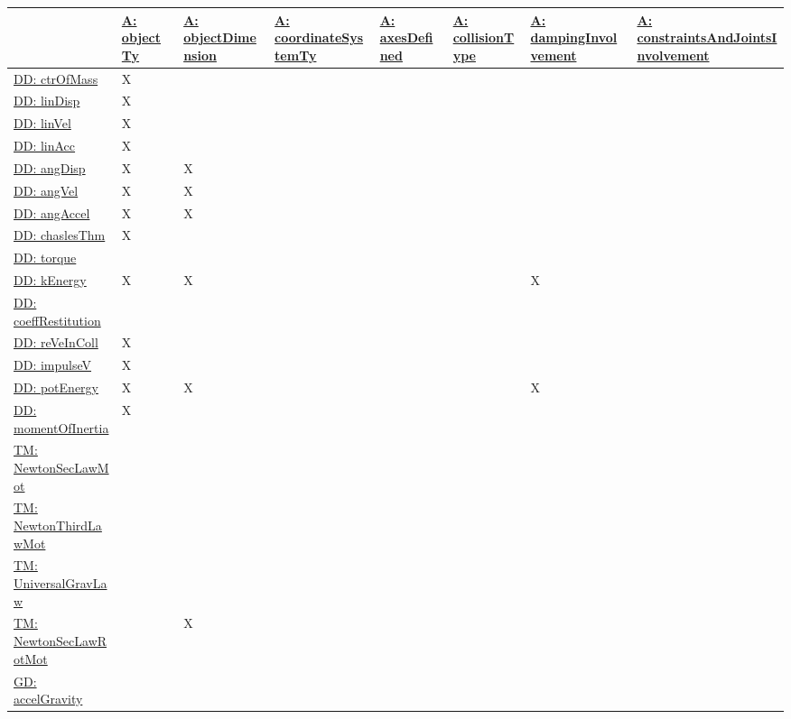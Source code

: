 \documentclass[12pt]{article}
\begin{document}
\begin{longtable}{l l l l l l l l}
\toprule
\textbf{} & \textbf{\hyperref[assumpOT]{A: objectTy}} & \textbf{\hyperref[assumpOD]{A: objectDimension}} & \textbf{\hyperref[assumpCST]{A: coordinateSystemTy}} & \textbf{\hyperref[assumpAD]{A: axesDefined}} & \textbf{\hyperref[assumpCT]{A: collisionType}} & \textbf{\hyperref[assumpDI]{A: dampingInvolvement}} & \textbf{\hyperref[assumpCAJI]{A: constraintsAndJointsInvolvement}}
\\
\midrule
\endhead
\hyperref[DD:ctrOfMass]{DD: ctrOfMass} & X &  &  &  &  &  & 
\\
\hyperref[DD:linDisp]{DD: linDisp} & X &  &  &  &  &  & 
\\
\hyperref[DD:linVel]{DD: linVel} & X &  &  &  &  &  & 
\\
\hyperref[DD:linAcc]{DD: linAcc} & X &  &  &  &  &  & 
\\
\hyperref[DD:angDisp]{DD: angDisp} & X & X &  &  &  &  & 
\\
\hyperref[DD:angVel]{DD: angVel} & X & X &  &  &  &  & 
\\
\hyperref[DD:angAccel]{DD: angAccel} & X & X &  &  &  &  & 
\\
\hyperref[DD:chaslesThm]{DD: chaslesThm} & X &  &  &  &  &  & 
\\
\hyperref[DD:torque]{DD: torque} &  &  &  &  &  &  & 
\\
\hyperref[DD:kEnergy]{DD: kEnergy} & X & X &  &  &  & X & 
\\
\hyperref[DD:coeffRestitution]{DD: coeffRestitution} &  &  &  &  &  &  & 
\\
\hyperref[DD:reVeInColl]{DD: reVeInColl} & X &  &  &  &  &  & 
\\
\hyperref[DD:impulseV]{DD: impulseV} & X &  &  &  &  &  & 
\\
\hyperref[DD:potEnergy]{DD: potEnergy} & X & X &  &  &  & X & 
\\
\hyperref[DD:momentOfInertia]{DD: momentOfInertia} & X &  &  &  &  &  & 
\\
\hyperref[TM:NewtonSecLawMot]{TM: NewtonSecLawMot} &  &  &  &  &  &  & 
\\
\hyperref[TM:NewtonThirdLawMot]{TM: NewtonThirdLawMot} &  &  &  &  &  &  & 
\\
\hyperref[TM:UniversalGravLaw]{TM: UniversalGravLaw} &  &  &  &  &  &  & 
\\
\hyperref[TM:NewtonSecLawRotMot]{TM: NewtonSecLawRotMot} &  & X &  &  &  &  & 
\\
\hyperref[GD:accelGravity]{GD: accelGravity} &  &  &  &  &  &  & 

\end{longtable}
\end{document}
